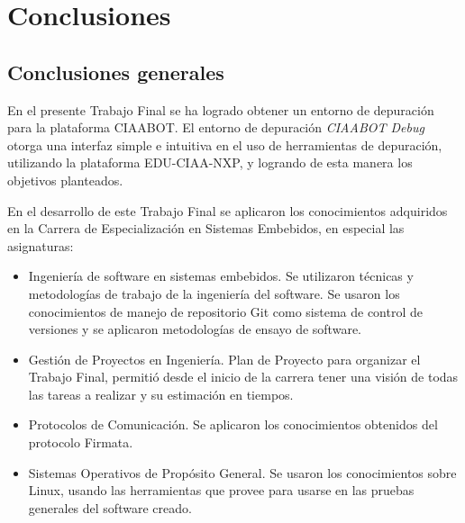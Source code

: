
\chapter{Conclusiones} %

\label{Chapter5} %




\section{Conclusiones generales }

En el presente Trabajo Final se ha logrado obtener un entorno de depuración para la plataforma CIAABOT. El entorno de depuración \emph{ CIAABOT Debug} otorga una interfaz simple e intuitiva en el uso de herramientas de depuración, utilizando la plataforma EDU-CIAA-NXP, y logrando de esta manera los objetivos planteados.

En el desarrollo de este Trabajo Final se aplicaron los conocimientos adquiridos en la Carrera de Especialización en Sistemas Embebidos, en especial las asignaturas:

\begin{itemize}
	\item Ingeniería de software en sistemas embebidos. Se utilizaron técnicas y metodologías de trabajo de la ingeniería del software. Se usaron los conocimientos de manejo de repositorio Git como sistema de control de versiones y se aplicaron metodologías de ensayo de software.
	\item Gestión de Proyectos en Ingeniería. Plan de Proyecto para organizar el Trabajo Final, permitió desde el inicio de la carrera tener una visión de todas las tareas a realizar y su estimación en tiempos.
	\item Protocolos de Comunicación. Se aplicaron los conocimientos obtenidos del protocolo Firmata.
	\item Sistemas Operativos de Propósito General. Se usaron los conocimientos sobre Linux, usando las herramientas que provee para usarse en las pruebas generales del software creado.
\end{itemize}



